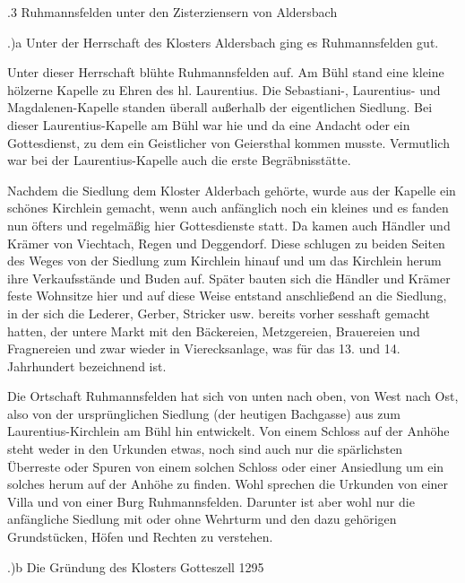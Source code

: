 .3 Ruhmannsfelden unter den Zisterziensern von Aldersbach

.)a Unter der Herrschaft des Klosters Aldersbach ging es Ruhmannsfelden gut.



Unter dieser Herrschaft blühte Ruhmannsfelden auf. Am Bühl stand eine kleine
hölzerne Kapelle zu Ehren des hl. Laurentius. Die Sebastiani-, Laurentius- und
Magdalenen-Kapelle standen überall außerhalb der eigentlichen Siedlung. Bei
dieser Laurentius-Kapelle am Bühl war hie und da eine Andacht oder ein
Gottesdienst, zu dem ein Geistlicher von Geiersthal kommen musste. Vermutlich
war bei der Laurentius-Kapelle auch die erste Begräbnisstätte.

Nachdem die Siedlung dem Kloster Alderbach gehörte, wurde aus der Kapelle ein
schönes Kirchlein gemacht, wenn auch anfänglich noch ein kleines und es fanden
nun öfters und regelmäßig hier Gottesdienste statt. Da kamen auch Händler und
Krämer von Viechtach, Regen und Deggendorf. Diese schlugen zu beiden Seiten des
Weges von der Siedlung zum Kirchlein hinauf und um das Kirchlein herum ihre
Verkaufsstände und Buden auf. Später bauten sich die Händler und Krämer feste
Wohnsitze hier und auf diese Weise entstand anschließend an die Siedlung, in der
sich die Lederer, Gerber, Stricker usw. bereits vorher sesshaft gemacht hatten,
der untere Markt mit den Bäckereien, Metzgereien, Brauereien und Fragnereien und
zwar wieder in Vierecksanlage, was für das 13. und 14. Jahrhundert bezeichnend
ist.

Die Ortschaft Ruhmannsfelden hat sich von unten nach oben, von West nach Ost,
also von der ursprünglichen Siedlung (der heutigen Bachgasse) aus zum
Laurentius-Kirchlein am Bühl hin entwickelt. Von einem Schloss auf der Anhöhe
steht weder in den Urkunden etwas, noch sind auch nur die spärlichsten Überreste
oder Spuren von einem solchen Schloss oder einer Ansiedlung um ein solches herum
auf der Anhöhe zu finden. Wohl sprechen die Urkunden von einer Villa und von
einer Burg Ruhmannsfelden. Darunter ist aber wohl nur die anfängliche Siedlung
mit oder ohne Wehrturm und den dazu gehörigen Grundstücken, Höfen und Rechten zu
verstehen.

.)b Die Gründung des Klosters Gotteszell 1295

